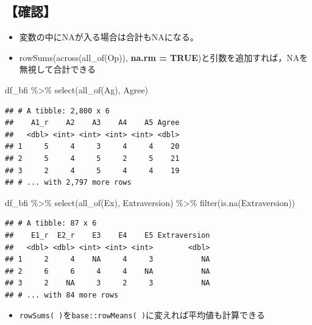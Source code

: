 \documentclass[
  xelatex,ja=standard, b5paper]{bxjsbook}
\newenvironment{Shaded}{\begin{snugshade}}{\end{snugshade}}
\newcommand{\FunctionTok}[1]{\textcolor[rgb]{0.00,0.00,0.00}{#1}}
\newcommand{\NormalTok}[1]{#1}
\newcommand{\SpecialCharTok}[1]{\textcolor[rgb]{0.00,0.00,0.00}{#1}}
\providecommand{\tightlist}{%
  \setlength{\itemsep}{0pt}\setlength{\parskip}{0pt}}
\begin{document}
\hypertarget{ux78baux8a8d}{%
\subsection{【確認】}\label{ux78baux8a8d}}

\begin{itemize}
\tightlist
\item
  変数の中にNAが入る場合は合計もNAになる。
\item
  rowSums(across(all\_of(Op)), \textbf{na.rm = TRUE})と引数を追加すれば，NAを無視して合計できる
\end{itemize}

\begin{Shaded}
\begin{Highlighting}[]
\NormalTok{df\_bfi }\SpecialCharTok{\%\textgreater{}\%} \FunctionTok{select}\NormalTok{(}\FunctionTok{all\_of}\NormalTok{(Ag), Agree)}
\end{Highlighting}
\end{Shaded}

\begin{verbatim}
## # A tibble: 2,800 x 6
##    A1_r    A2    A3    A4    A5 Agree
##   <dbl> <int> <int> <int> <int> <dbl>
## 1     5     4     3     4     4    20
## 2     5     4     5     2     5    21
## 3     2     4     5     4     4    19
## # ... with 2,797 more rows
\end{verbatim}

\begin{Shaded}
\begin{Highlighting}[]
\NormalTok{df\_bfi }\SpecialCharTok{\%\textgreater{}\%} 
  \FunctionTok{select}\NormalTok{(}\FunctionTok{all\_of}\NormalTok{(Ex), Extraversion) }\SpecialCharTok{\%\textgreater{}\%} 
  \FunctionTok{filter}\NormalTok{(}\FunctionTok{is.na}\NormalTok{(Extraversion))}
\end{Highlighting}
\end{Shaded}

\begin{verbatim}
## # A tibble: 87 x 6
##    E1_r  E2_r    E3    E4    E5 Extraversion
##   <dbl> <dbl> <int> <int> <int>        <dbl>
## 1     2     4    NA     4     3           NA
## 2     6     6     4     4    NA           NA
## 3     2    NA     3     2     3           NA
## # ... with 84 more rows
\end{verbatim}

\begin{itemize}
\tightlist
\item
  \texttt{rowSums(\ )}を\texttt{base::rowMeans(\ )}に変えれば平均値も計算できる
\end{itemize}
\end{document}
